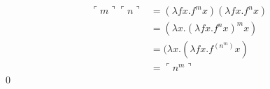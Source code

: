 \label{3.19}
\begin{pf} \rm \;
$$
\begin{aligned}
    \ulcorner m \urcorner \ulcorner n \urcorner
    &= (\lambda fx. f^m x)(\lambda f x.f^n x)\\
    &= (\lambda x. (\lambda fx. f^n x)^m x) \\
    &= (\lambda x. (\lambda fx. f^{(n^m)} x) \\
    &= \ulcorner n^m \urcorner
\end{aligned}$$
    \qed 
\end{pf}